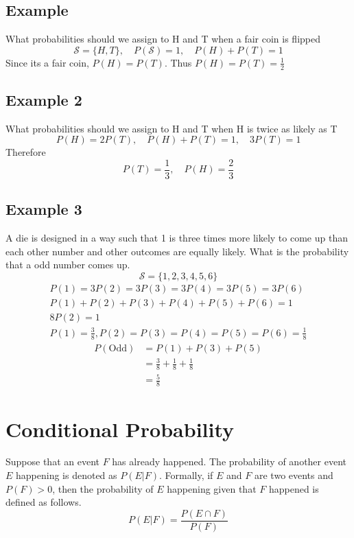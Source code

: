 \documentclass{article}
\theoremstyle{mytheoremstyle}
\theoremstyle{mytheoremstyle}
\theoremstyle{myproblemstyle}
\begin{document}
    \subsection*{Example}
    What probabilities should we assign to H and T when a fair coin is flipped
    \[
        \mathcal{S} = \{H,T\},\quad P(\mathcal{S})=1,\quad P(H) + P(T) = 1
    \]
    Since its a fair coin, $P(H)=P(T)$. Thus $P(H)=P(T)=\frac{1}{2}$

    \subsection*{Example 2}
    What probabilities should we assign to H and T when H is twice as likely as
    T
    \[
        P(H) = 2P(T),\quad P(H)+P(T) = 1,\quad 3P(T) = 1
    \]
    Therefore
    \[
        P(T)=\frac{1}{3},\quad P(H)=\frac{2}{3}
    \]

    \subsection*{Example 3}
    A die is designed in a way such that 1 is three times more likely to come up
    than each other number and other outcomes are equally likely. What is the
    probability that a odd number comes up.
    \[
        \mathcal{S} = \{1,2,3,4,5,6\}
    \]
    \begin{align*}
        P(1) = 3P(2) = 3P(3) = 3P(4) = 3P(5) = 3P(6) \\
        P(1) + P(2) + P(3) + P(4) + P(5) + P(6) = 1 \\
        8P(2) = 1 \\
        P(1)=\frac{3}{8}, P(2)=P(3)=P(4)=P(5)=P(6)=\frac{1}{8}
    \end{align*}
    \begin{align*}
        P(\text{Odd}) &= P(1) + P(3) + P(5) \\
                      &= \frac{3}{8} + \frac{1}{8} + \frac{1}{8} \\
                      &= \frac{5}{8}
    \end{align*}

    \section*{Conditional Probability}
    Suppose that an event $F$ has already happened. The probability of another
    event $E$ happening is denoted as $P(E | F)$. Formally, if $E$ and $F$ are
    two events and $P(F)>0$, then the probability of $E$ happening given that
    $F$ happened is defined as follows.
    \[
        P(E|F) = \frac{P(E\cap F)}{P(F)}
    \]
\end{document}
